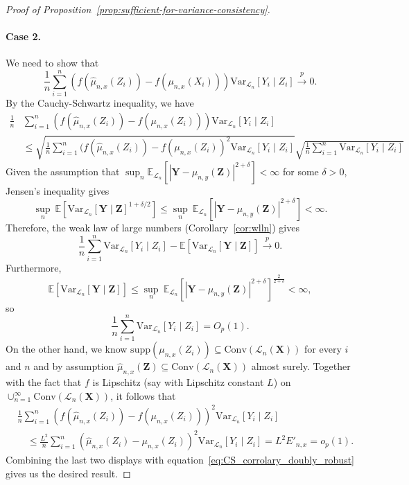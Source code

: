 \documentclass[12pt]{article}
\theoremstyle{definition}
\theoremstyle{remark}
\newcommand{\E}{\mathbb E}								%
\newcommand{\V}{\mathrm{Var}}							%
\newcommand{\convp}{\overset p \rightarrow}             %
\newcommand{\prx}{\bm X}								%
\newcommand{\srx}{X}									%
\newcommand{\prz}{\bm Z}								%
\newcommand{\srz}{Z}									%
\newcommand{\pry}{{\bm Y}}								%
\newcommand{\sry}{Y}									%
\newcommand{\law}{\mathcal L}							%
\begin{document}
\begin{proof}[Proof of Proposition~\ref{prop:sufficient-for-variance-consistency}]
\paragraph{Case 2.}
We need to show that
$$
\frac{1}{n} \sum_{i=1}^n (f(\widehat \mu_{n,x}(Z_i))-f(\mu_{n,x}(\srx_i)))\V_{\law_n}[\sry_i\mid \srz_i] \convp 0.
$$
By the Cauchy-Schwartz inequality, we have
\begin{equation}
\begin{split} \label{eq:CS_corrolary_doubly_robust}
	\frac{1}{n} &\sum_{i=1}^n (f(\widehat \mu_{n,x}(\srz_i))-f(\mu_{n,x}(\srz_i)))\V_{\law_n}[\sry_i\mid \srz_i]\\ &\leq \sqrt{\frac{1}{n} \sum_{i=1}^n (f(\widehat \mu_{n,x}(Z_i))-f( \mu_{n,x}(Z_i))^2\V_{\law_n}[\sry_i\mid \srz_i]}\sqrt{\frac{1}{n} \sum_{i=1}^n \V_{\law_n}[\sry_i\mid \srz_i]}
\end{split}
\end{equation}
Given the assumption that $\sup_n \E_{\law_n}[|\pry-\mu_{n,y}(\prz)|^{2+\delta}] < \infty$ for some $\delta>0$, Jensen's inequality gives
\begin{equation*}
	\sup_n\ \E[\V_{\law_n}[\pry\mid \prz]^{1+\delta/2}] \leq \sup_n\ \E_{\law_n}[|\pry-\mu_{n,y}(\prz)|^{2+\delta}] < \infty.
\end{equation*}
Therefore, the weak law of large numbers (Corollary~\ref{cor:wlln}) gives
\begin{equation*}
\frac{1}{n} \sum_{i=1}^n \V_{\law_n}[\sry_i\mid \srz_i]- \E[\V_{\law_n}[\pry\mid \prz]]\convp 0.
\end{equation*}
Furthermore, 
\begin{equation*}
\E[\V_{\law_n}[\pry\mid \prz]] \leq \sup_n\ \E_{\law_n}[|\pry-\mu_{n,y}(\prz)|^{2+\delta}]^{\frac2{2+\delta}} < \infty,
\end{equation*}
so 
\begin{equation*}
	\frac{1}{n} \sum_{i=1}^n \V_{\law_n}[\sry_i\mid \srz_i] = O_p(1).
\end{equation*}
On the other hand, we know $\mathrm{supp}(\mu_{n,x}(Z_i))\subseteq \mathrm{Conv}(\law_n(\prx))$ for every $i$ and $n$ and by assumption $\widehat{\mu}_{n,x}(\prz)\subseteq\mathrm{Conv}(\law_n(\prx))$ almost surely. Together with the fact that $f$ is Lipschitz (say with Lipschitz constant $L$) on $\cup_{n=1}^{\infty}\mathrm{Conv}(\law_n(\prx))$, it follows that
\begin{align*}
&\frac{1}{n} \sum_{i=1}^n (f(\widehat \mu_{n,x}(Z_i))-f( \mu_{n,x}(Z_i)))^2\V_{\law_n}[\sry_i\mid \srz_i] \\
&\quad\leq 
\frac{L^2}{n} \sum_{i=1}^n (\widehat \mu_{n,x}(Z_i)- \mu_{n,x}(Z_i))^2\V_{\law_n}[\sry_i\mid \srz_i] = L^2E'_{n,x} = o_p(1).
\end{align*}
Combining the last two displays with equation~\eqref{eq:CS_corrolary_doubly_robust} gives us the desired result.
\end{proof}
\end{document}
